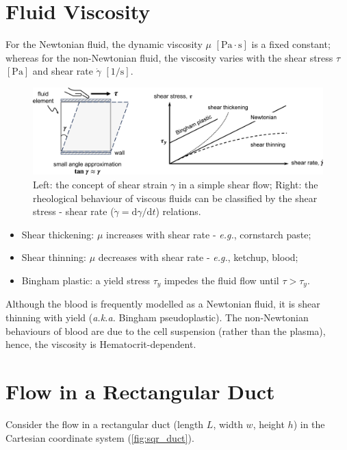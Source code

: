 \documentclass[a4paper]{article}
\begin{document}
\section{Fluid Viscosity}
For the Newtonian fluid, the dynamic viscosity $\mu$ $[\mathrm{Pa} \cdot \mathrm{s}]$ is a fixed constant; whereas for the non-Newtonian fluid, the viscosity varies with the shear stress $\tau$ $[\mathrm{Pa}]$ and shear rate $\dot{\gamma}$ $[1/\mathrm{s}]$.
\begin{figure}[H]
    \centering
    \includegraphics[width=\textwidth]{img/rheology.eps}
    \caption{Left: the concept of shear strain $\gamma$ in a simple shear flow; Right: the rheological behaviour of viscous fluids can be classified by the shear stress - shear rate ($\dot{\gamma} = \mathrm{d}\gamma / \mathrm{d}t$) relations.}
\end{figure}
\begin{itemize}
    \item Shear thickening: $\mu$ increases with shear rate - \textit{e.g.}, cornstarch paste;
    \item Shear thinning: $\mu$ decreases with shear rate - \textit{e.g.}, ketchup, blood;
    \item Bingham plastic: a yield stress $\tau_y$ impedes the fluid flow until $\tau > \tau_y$.
\end{itemize}
Although the blood is frequently modelled as a Newtonian fluid, it is shear thinning with yield (\textit{a.k.a.} Bingham pseudoplastic). The non-Newtonian behaviours of blood are due to the cell suspension (rather than the plasma), hence, the viscosity is Hematocrit-dependent.


\section{Flow in a Rectangular Duct}
Consider the flow in a rectangular duct (length $L$, width $w$, height $h$) in the Cartesian coordinate system (\autoref{fig:sqr_duct}).
\end{document}
